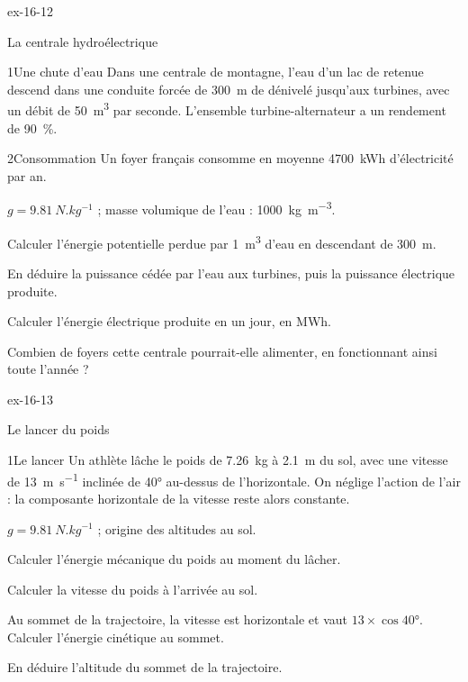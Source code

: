 \begin{blocLivre}{ex-16-12}
\begin{exercice}[3]{La centrale hydroélectrique}
\begin{docu}{1}{Une chute d'eau}
Dans une centrale de montagne, l'eau d'un lac de retenue descend dans une conduite forcée de \qty{300}{m} de dénivelé jusqu'aux turbines,
avec un débit de \qty{50}{m^3} par seconde. L'ensemble turbine-alternateur a un rendement de \qty{90}{\percent}.
\end{docu}
\begin{docu}{2}{Consommation}
Un foyer français consomme en moyenne \qty{4700}{kWh} d'électricité par an.
\end{docu}
\begin{donnees}
$g=\qty{9,81}{N.kg^{-1}}$ ; masse volumique de l'eau : \qty{1000}{kg.m^{-3}}.
\end{donnees}
\begin{questions}
\item Calculer l'énergie potentielle perdue par \qty{1}{m^3} d'eau en descendant de \qty{300}{m}.
\item En déduire la puissance cédée par l'eau aux turbines, puis la puissance électrique produite.
\item Calculer l'énergie électrique produite en un jour, en \unit{MWh}.
\item \initiative Combien de foyers cette centrale pourrait-elle alimenter, en fonctionnant ainsi toute l'année ?
\end{questions}
\end{exercice}
\end{blocLivre}
\begin{blocLivre}{ex-16-13}
\begin{exercice}[3]{Le lancer du poids}
\begin{docu}{1}{Le lancer}
Un athlète lâche le poids de \qty{7,26}{kg} à \qty{2,1}{m} du sol, avec une vitesse de \qty{13}{m.s^{-1}} inclinée de \ang{40} au-dessus de l'horizontale. On
néglige l'action de l'air : la composante horizontale de la vitesse reste alors constante.
\end{docu}
\begin{donnees}
$g=\qty{9,81}{N.kg^{-1}}$ ; origine des altitudes au sol.
\end{donnees}
\begin{questions}
\item Calculer l'énergie mécanique du poids au moment du lâcher.
\item Calculer la vitesse du poids à l'arrivée au sol.
\item Au sommet de la trajectoire, la vitesse est horizontale et vaut $13\times\cos\ang{40}$. Calculer l'énergie cinétique au sommet.
\item \initiative En déduire l'altitude du sommet de la trajectoire.
\end{questions}
\end{exercice}
\end{blocLivre}
